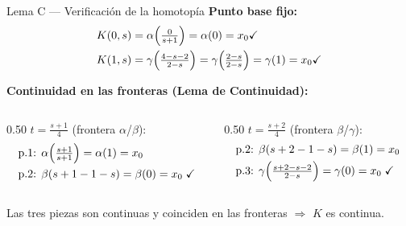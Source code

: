 \begin{frame}{Lema C — Verificación de la homotopía}
  \textbf{Punto base fijo:}
  \begin{align*}
    K(0,s) &= \alpha\!\left(\tfrac{0}{s+1}\right) = \alpha(0) = x_0 \checkmark\\
    K(1,s) &= \gamma\!\left(\tfrac{4-s-2}{2-s}\right) = \gamma\!\left(\tfrac{2-s}{2-s}\right) = \gamma(1) = x_0 \checkmark
  \end{align*}

  \smallskip
  \textbf{Continuidad en las fronteras (Lema de Continuidad):}

  \begin{columns}[T]
    \begin{column}{0.50\textwidth}
      \small $t = \tfrac{s+1}{4}$ \;(frontera $\alpha$/$\beta$):
      \begin{align*}
        \text{p.1: }&\alpha\!\left(\tfrac{s+1}{s+1}\right) = \alpha(1) = x_0 \\
        \text{p.2: }&\beta(s+1-1-s) = \beta(0) = x_0 \;\checkmark
      \end{align*}
    \end{column}
    \begin{column}{0.50\textwidth}
      \small $t = \tfrac{s+2}{4}$ \;(frontera $\beta$/$\gamma$):
      \begin{align*}
        \text{p.2: }&\beta(s+2-1-s) = \beta(1) = x_0 \\
        \text{p.3: }&\gamma\!\left(\tfrac{s+2-s-2}{2-s}\right) = \gamma(0) = x_0 \;\checkmark
      \end{align*}
    \end{column}
  \end{columns}

  \smallskip
  Las tres piezas son continuas y coinciden en las fronteras $\Rightarrow$ $K$ es continua.
\end{frame}

